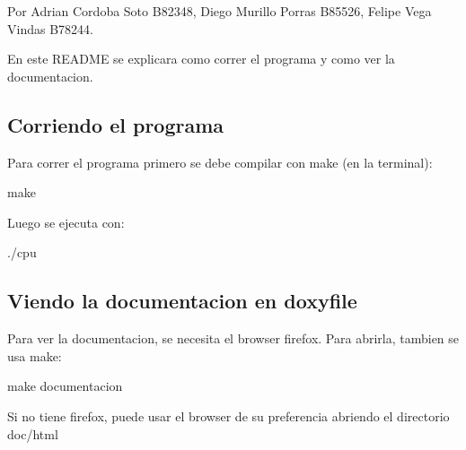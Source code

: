 Por Adrian Cordoba Soto B82348, Diego Murillo Porras B85526, Felipe Vega Vindas B78244.

En este R\+E\+A\+D\+ME se explicara como correr el programa y como ver la documentacion.

\subsection*{Corriendo el programa}

Para correr el programa primero se debe compilar con {\ttfamily make} (en la terminal)\+: 
\begin{DoxyCode}
make
\end{DoxyCode}
 Luego se ejecuta con\+: 
\begin{DoxyCode}
./cpu
\end{DoxyCode}


\subsection*{Viendo la documentacion en doxyfile}

Para ver la documentacion, se necesita el browser firefox. Para abrirla, tambien se usa {\ttfamily make}\+: 
\begin{DoxyCode}
make documentacion
\end{DoxyCode}
 Si no tiene firefox, puede usar el browser de su preferencia abriendo el directorio {\ttfamily doc/html} 